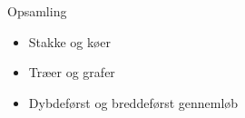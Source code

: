 \documentclass[a4paper,landscape]{slides}
\begin{document}
\begin{slide}
	\begin{center} {\large 
      Opsamling
	} \end{center}
	\begin{itemize} \addtolength{\itemsep}{-\baselineskip}
      \item     Stakke og køer
      \item     Træer og grafer
      \item     Dybdeførst og breddeførst gennemløb
	\end{itemize}
\end{slide}
\end{document}
